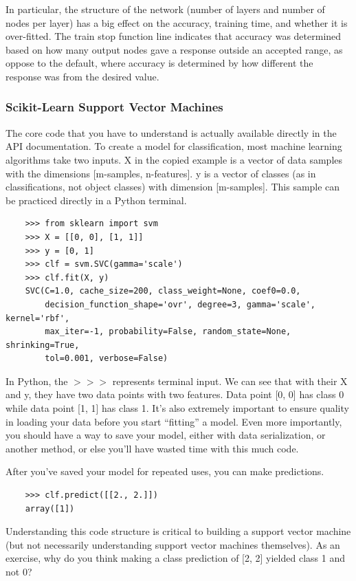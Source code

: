 \documentclass[10pt,journal,compsoc, draftclsnofoot,onecolumn]{IEEEtran}
\begin{document}
In particular, the structure of the network (number of layers and number of nodes per layer) has a big effect on the accuracy, training time, and whether it is over-fitted. The train stop function line indicates that accuracy was determined based on how many output nodes gave a response outside an accepted range, as oppose to the default, where accuracy is determined by how different the response was from the desired value.



\subsubsection{Scikit-Learn Support Vector Machines}
The core code that you have to understand is actually available directly in the API documentation.
To create a model for classification, most machine learning algorithms take two inputs.
X in the copied example is a vector of data samples with the dimensions [m-samples, n-features].
y is a vector of classes (as in classifications, not object classes) with dimension [m-samples].
This sample can be practiced directly in a Python terminal.
\begin{verbatim}
    >>> from sklearn import svm
    >>> X = [[0, 0], [1, 1]]
    >>> y = [0, 1]
    >>> clf = svm.SVC(gamma='scale')
    >>> clf.fit(X, y)  
    SVC(C=1.0, cache_size=200, class_weight=None, coef0=0.0,
        decision_function_shape='ovr', degree=3, gamma='scale', kernel='rbf',
        max_iter=-1, probability=False, random_state=None, shrinking=True,
        tol=0.001, verbose=False)
\end{verbatim}
In Python, the $>>>$ represents terminal input.
We can see that with their X and y, they have two data points with two features.
Data point [0, 0] has class 0 while data point [1, 1] has class 1.
It's also extremely important to ensure quality in loading your data before you start ``fitting'' a model.
Even more importantly, you should have a way to save your model, either with data serialization, or another method, or else you'll have wasted time with this much code.

After you've saved your model for repeated uses, you can make predictions.
\begin{verbatim}
    >>> clf.predict([[2., 2.]])
    array([1])
\end{verbatim}
Understanding this code structure is critical to building a support vector machine (but not necessarily understanding support vector machines themselves).
As an exercise, why do you think making a class prediction of [2, 2] yielded class 1 and not 0?
\end{document}
